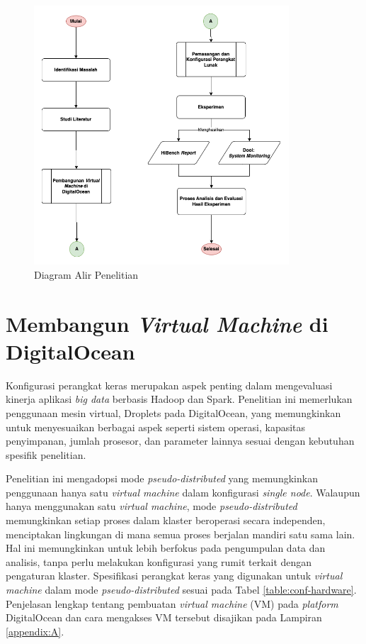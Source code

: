 \begin{figure}[h!]
    \centering
    \includegraphics[width=0.85\textwidth]{figures/ch03/Diagram Tugas Akhir.png}
    \caption{Diagram Alir Penelitian}
    \label{fig:diagram alir}
\end{figure}

\section{Membangun \textit{Virtual Machine} di DigitalOcean}
Konfigurasi perangkat keras merupakan aspek penting dalam mengevaluasi kinerja aplikasi \textit{big data} berbasis Hadoop dan Spark. Penelitian ini memerlukan penggunaan mesin virtual, Droplets pada DigitalOcean, yang memungkinkan untuk menyesuaikan berbagai aspek seperti sistem operasi, kapasitas penyimpanan, jumlah prosesor, dan parameter lainnya sesuai dengan kebutuhan spesifik penelitian.

Penelitian ini mengadopsi mode \textit{pseudo-distributed} yang memungkinkan penggunaan hanya satu \textit{virtual machine} dalam konfigurasi \textit{single node}. Walaupun hanya menggunakan satu \textit{virtual machine}, mode \textit{pseudo-distributed} memungkinkan setiap proses dalam klaster beroperasi secara independen, menciptakan lingkungan di mana semua proses berjalan mandiri satu sama lain. Hal ini memungkinkan untuk lebih berfokus pada pengumpulan data dan analisis, tanpa perlu melakukan konfigurasi yang rumit terkait dengan pengaturan klaster. Spesifikasi perangkat keras yang digunakan untuk \textit{virtual machine} dalam mode \textit{pseudo-distributed} sesuai pada Tabel \ref{table:conf-hardware}. Penjelasan lengkap tentang pembuatan \textit{virtual machine} (VM) pada \textit{platform} DigitalOcean dan cara mengakses VM tersebut disajikan pada Lampiran \ref{appendix:A}.

